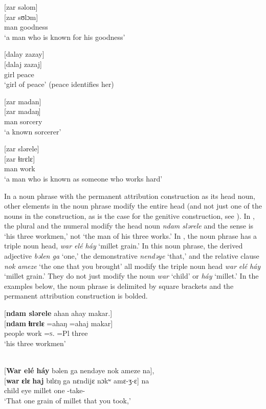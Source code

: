 \ea \label{ex:5:88}
{}[zar  səlom]\\
\gll  {}[zar   sʊlɔm]\\
      man    goodness\\
\glt  ‘a man who is known for his goodness’
\z

\ea \label{ex:5:89}
{}[dalay  zazay]\\
\gll  {}[dalaj   zazaj]\\
      girl    peace\\
\glt  ‘girl of peace’ (peace identifies her)
\z

\ea \label{ex:5:90}
{}[zar  madan]\\
\gll  {}[zar   madaŋ]\\
      man    sorcery\\
\glt  ‘a known sorcerer’
\z

\ea \label{ex:5:91}
{}[zar  slərele]\\
\gll  {}[zar   ɬɪrɛlɛ]\\
      man    work\\
\glt  ‘a man who is known as someone who works hard’
\z

In a noun phrase with the permanent attribution construction as its head noun, other elements in the noun phrase modify the entire head (and not just one of the nouns in the construction, as is the case for the genitive construction, see ). In , the plural and the numeral modify the head noun \textit{ndam slərele} and the sense is ‘his three workmen,’ not ‘the man of his three works.’  In , the noun phrase has a triple noun head, \textit{war elé  háy} ‘millet grain.’ In this noun phrase, the derived adjective \textit{bəlen ga} ‘one,’ the demonstrative \textit{nendəye} ‘that,’ and the relative clause \textit{nok ameze}  ‘the one that you brought’ all modify the triple noun head \textit{war} \textit{elé} \textit{háy}  ‘millet grain.’ They do not just modify the noun \textit{war} ‘child’ or \textit{háy} ‘millet.’ In the examples below, the noun phrase is delimited by square brackets and the permanent attribution construction is bolded. 

\ea \label{ex:5:92}
{}[\textbf{ndam  slərele} ahan  ahay  makar.]\\
\gll  {}[\textbf{ndam}   \textbf{ɬɪrɛlɛ}    =ahaŋ     =ahaj   makar]\\
      people  work  =\textsc{s}.{\POSS}  =Pl  three\\
\glt  ‘his three workmen’
\z

\ea \label{ex:5:93}\\
{}[\textbf{War  elé  háy}  bəlen  ga  nendəye  nok  ameze   na],  \\
\gll  {}[\textbf{war} \textbf{ɛlɛ} \textbf{haj}     bɪlɛŋ   ga    nɛndijɛ    nɔkʷ     amɛ-ʒ-ɛ] na\\
      child    eye    millet   one   {\ADJ}    {\DEM}      {\twoS}         {\DEP}-take-{\CL}   {\PSP}\\
\glt ‘That one grain of millet that you took,’

